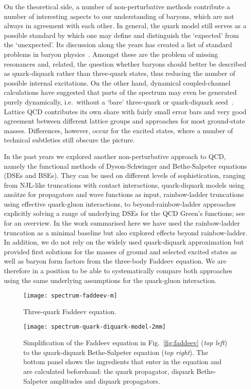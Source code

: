 \documentclass[epj,twocolumn]{webofc}
\begin{document}
On the theoretical side, a number of non-perturbative methods contribute a number of interesting aspects
to our understanding of baryons, which are
not always in agreement with each other. In general, the quark model still serves as a possible
standard by which one may define and distinguish the `expected' from the `unexpected'. Its
discussion along the years has created a list of standard problems in baryon physics~\cite{Capstick:2000qj,Klempt:2009pi}.
Amongst these are the problem of missing resonances and,
related, the question whether baryons should better be described as quark-diquark rather than
three-quark states, thus reducing the number of possible internal excitations. On the other hand,
dynamical coupled-channel calculations have suggested that parts of the spectrum may even be
generated purely dynamically, i.e.\ without a `bare' three-quark or quark-diquark
seed~\cite{Doring:2009yv,Bruns:2010sv}. Lattice QCD contributes its own share with fairly small
error bars and very good agreement between different lattice groups and approaches for most ground-state
masses. Differences, however, occur for the excited states, where a number of technical
subtleties still obscure the picture.

In the past years we explored another non-perturbative approach to QCD, namely the functional
methods of Dyson-Schwinger and Bethe-Salpeter equations (DSEs and BSEs). They can be used on different
levels of sophistication, ranging from NJL-like truncations with contact interactions, quark-diquark
models using ans\"atze for propagators and wave functions as input, rainbow-ladder truncations
using effective quark-gluon interactions, to beyond-rainbow-ladder approaches explicitly solving
a range of underlying DSEs for the QCD Green's functions; see~\cite{Eichmann:2016yit} for an overview.
In the work summarised here we have used the rainbow-ladder truncation as a minimal baseline
but also explored effects beyond rainbow-ladder. In addition, we do not rely on the widely used
quark-diquark approximation but provided first solutions for the masses of ground and selected
excited states as well as baryon form factors from the three-body Faddeev equation. We are therefore
in a position to be able to systematically compare both approaches using the same underlying assumptions for
the quark-gluon interaction.

           \begin{figure*}[t]
            \centering
            \texttt{[image: spectrum-faddeev-m]}
            \caption{Three-quark Faddeev equation.}
            \label{fig:faddeev}
            \texttt{[image: spectrum-quark-diquark-model-2mm]}
            \caption{Simplification of the Faddeev equation in Fig.~\ref{fig:faddeev}
            (\textit{top left}) to the quark-diquark Bethe-Salpeter equation (\textit{top right}).
                     The bottom panel shows the ingredients that enter in the equation and are calculated
                     beforehand: the quark propagator, diquark Bethe-Salpeter amplitudes and diquark propagators.}
            \label{fig:quark-diquark}
            \end{figure*}
\end{document}
